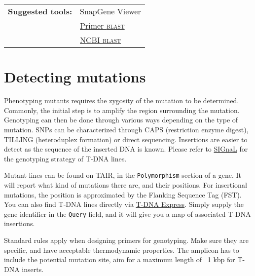 \documentclass[11pt]{article}
\begin{document}
	\vspace*{\baselineskip}

\noindent\begin{tabular}{@{}ll}
	\textbf{Suggested tools:} & SnapGene Viewer \\
	& \href{https://www.ncbi.nlm.nih.gov/tools/primer-blast/}{Primer \textsc{blast}} \\
	& \href{https://blast.ncbi.nlm.nih.gov/Blast.cgi}{NCBI \textsc{blast}} \\
\end{tabular} 
	
	\section{Detecting mutations\label{sec:mut}}
 	Phenotyping mutants requires the zygosity of the mutation to be determined. Commonly, the initial step is to amplify the region surrounding the mutation. Genotyping can then be done through various ways depending on the type of mutation. SNPs can be characterized through CAPS (restriction enzyme digest), TILLING (heteroduplex formation) or direct sequencing. Insertions are easier to detect as the sequence of the inserted DNA is known. Please refer to \href{http://signal.salk.edu/tdnaprimers.2.html}{SIGnaL} for the genotyping strategy of T-DNA lines.
 	
 	Mutant lines can be found on TAIR, in the \texttt{Polymorphism} section of a gene. It will report what kind of mutations there are, and their positions. For insertional mutations, the position is approximated by the Flanking Sequence Tag (FST). You can also find T-DNA lines directly via  \href{http://signal.salk.edu/cgi-bin/tdnaexpress}{T-DNA Express}. Simply supply the gene identifier in the \texttt{Query} field, and it will give you a map of associated T-DNA insertions.
 	
 	Standard rules apply when designing primers for genotyping. Make sure they are specific, and have acceptable thermodynamic properties. The amplicon has to include the potential mutation site, aim for a maximum length of ~1 kbp for T-DNA inserts.
 	
\end{document}
